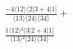 \documentclass[varwidth, border=5pt]{standalone}
\begin{document}
\begin{my}
$\begin{gathered}
\scriptscriptstyle\frac{-4⟨12⟩⟨2|3+4|1]}{⟨13⟩⟨24⟩⟨34⟩} +\\
\scriptscriptstyle\frac{1⟨12⟩²⟨3|2+4|1]}{⟨13⟩²⟨24⟩⟨34⟩} \phantom{+}
\end{gathered}$
\end{my}
\end{document}
